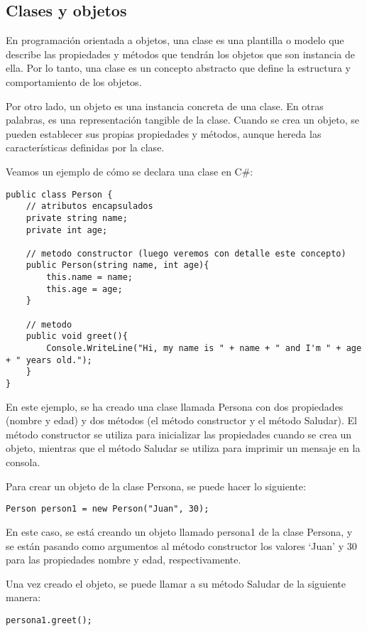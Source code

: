 \documentclass[executivepaper]{article}
\begin{document}
\subsection{Clases y objetos}

En programación orientada a objetos, una clase es una plantilla o modelo que describe las propiedades y métodos que tendrán los objetos que son instancia de ella. Por lo tanto, una clase es un concepto abstracto que define la estructura y comportamiento de los objetos.

Por otro lado, un objeto es una instancia concreta de una clase. En otras palabras, es una representación tangible de la clase. Cuando se crea un objeto, se pueden establecer sus propias propiedades y métodos, aunque hereda las características definidas por la clase.

Veamos un ejemplo de cómo se declara una clase en C\#:
\begin{lstlisting}
public class Person {
    // atributos encapsulados
    private string name;
    private int age;

    // metodo constructor (luego veremos con detalle este concepto)
    public Person(string name, int age){
        this.name = name;
        this.age = age;
    }

    // metodo
    public void greet(){
        Console.WriteLine("Hi, my name is " + name + " and I'm " + age + " years old.");
    }
}
\end{lstlisting}
En este ejemplo, se ha creado una clase llamada Persona con dos propiedades (nombre y edad) y dos métodos (el método constructor y el método Saludar). El método constructor se utiliza para inicializar las propiedades cuando se crea un objeto, mientras que el método Saludar se utiliza para imprimir un mensaje en la consola.

Para crear un objeto de la clase Persona, se puede hacer lo siguiente:

\begin{lstlisting}
Person person1 = new Person("Juan", 30);
\end{lstlisting}

En este caso, se está creando un objeto llamado persona1 de la clase Persona, y se están pasando como argumentos al método constructor los valores \enquote*{Juan} y 30 para las propiedades nombre y edad, respectivamente.

Una vez creado el objeto, se puede llamar a su método Saludar de la siguiente manera:

\begin{lstlisting}
persona1.greet();
\end{lstlisting}
\end{document}
